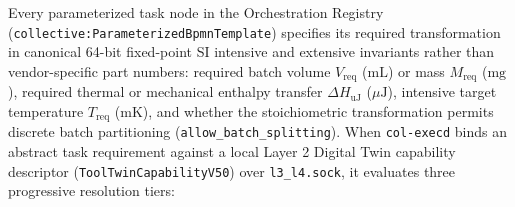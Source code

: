 Every parameterized task node in the Orchestration Registry (\texttt{collective:ParameterizedBpmnTemplate}) specifies its required transformation in canonical 64-bit fixed-point SI intensive and extensive invariants rather than vendor-specific part numbers: required batch volume $V_{\mathrm{req}}$ ($\mathrm{mL}$) or mass $M_{\mathrm{req}}$ ($\mathrm{mg}$), required thermal or mechanical enthalpy transfer $\Delta H_{\mathrm{uJ}}$ ($\mu\mathrm{J}$), intensive target temperature $T_{\mathrm{req}}$ ($\mathrm{mK}$), and whether the stoichiometric transformation permits discrete batch partitioning (\texttt{allow\_batch\_splitting}). When \texttt{col-execd} binds an abstract task requirement against a local Layer 2 Digital Twin capability descriptor (\texttt{ToolTwinCapabilityV50}) over \texttt{l3\_l4.sock}, it evaluates three progressive resolution tiers:


